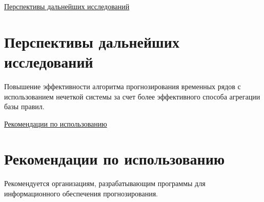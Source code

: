 \ifsynopsis
\ul{Перспективы дальнейших исследований}
\else
\section*{Перспективы дальнейших исследований}
\fi

Повышение эффективности алгоритма прогнозирования временных рядов с использованием нечеткой системы за счет более эффективного способа агрегации базы правил.



\ifsynopsis
\ul{Рекомендации по использованию}
\else
\section*{Рекомендации по использованию}
\fi

Рекомендуется организациям, разрабатывающим программы для информационного обеспечения прогнозирования.
